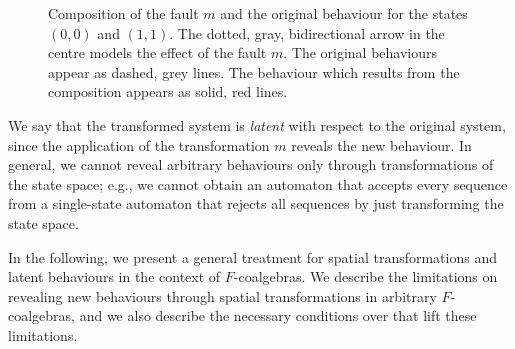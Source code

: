 \begin{figure}[t]
    \centering
    \caption{Composition of the fault $m$ and the original behaviour for the states $(0,0)$ and $(1,1)$. The dotted, gray, bidirectional arrow in the centre models the effect of the fault $m$. The original behaviours appear as dashed, grey lines. The behaviour which results from the composition appears as solid, red lines.}
    \label{fig:ExampleWithFaults}
\end{figure}
We say that the transformed system is \emph{latent} with respect to the original system, since the application of the transformation $m$ reveals the new behaviour. In general, we cannot reveal arbitrary behaviours only through transformations of the state space; e.g., we cannot obtain an automaton that accepts every sequence from a single-state automaton that rejects all sequences by just transforming the state space. 

In the following, we present a general treatment for spatial transformations and latent behaviours in the context of $F$-coalgebras. We describe the limitations on revealing new behaviours through  spatial transformations in arbitrary $F$-coalgebras, and we also describe the necessary conditions over that lift these limitations.

